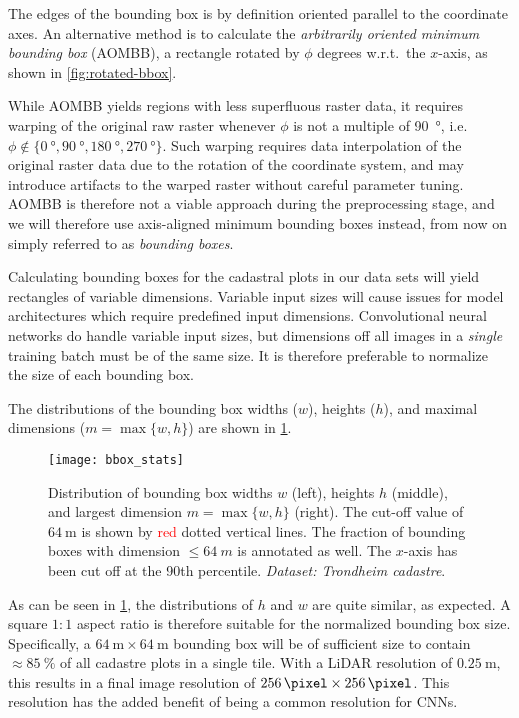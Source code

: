 The edges of the bounding box is by definition oriented parallel to the coordinate axes.
An alternative method is to calculate the \textit{arbitrarily oriented minimum bounding box} (AOMBB), a rectangle rotated by $\phi$ degrees w.r.t.\ the $x$-axis, as shown in \cref{fig:rotated-bbox}.

While AOMBB yields regions with less superfluous raster data, it requires warping of the original raw raster whenever $\phi$ is not a multiple of \SI{90}{\degree}, i.e.\ $\phi \not\in \{ \SI{0}{\degree}, \SI{90}{\degree}, \SI{180}{\degree}, \SI{270}{\degree} \}$.
Such warping requires data interpolation of the original raster data due to the rotation of the coordinate system, and may introduce artifacts to the warped raster without careful parameter tuning.
AOMBB is therefore not a viable approach during the preprocessing stage, and we will therefore use axis-aligned minimum bounding boxes instead, from now on simply referred to as \textit{bounding boxes}.

Calculating bounding boxes for the cadastral plots in our data sets will yield rectangles of variable dimensions.
Variable input sizes will cause issues for model architectures which require predefined input dimensions.
Convolutional neural networks do handle variable input sizes, but dimensions off all images in a \textit{single} training batch must be of the same size.
It is therefore preferable to normalize the size of each bounding box.

The distributions of the bounding box widths ($w$), heights ($h$), and maximal dimensions ($m = \max \{w, h\}$) are shown in \cref{fig:bbox-stats}.

\begin{figure}[htb]
  \texttt{[image: bbox\_stats]}
  \caption[Distribution of bounding box dimensions.]{%
    Distribution of bounding box widths $w$ (left), heights $h$ (middle), and largest dimension $m = \max \{w, h\}$ (right).
    The cut-off value of $\SI{64}{\meter}$ is shown by \textcolor{red}{red} dotted vertical lines.
    The fraction of bounding boxes with dimension $\leq \SI{64}{m}$ is annotated as well.
    The $x$-axis has been cut off at the 90th percentile.
    \textit{Dataset: Trondheim cadastre}.
  }%
  \label{fig:bbox-stats}
\end{figure}

As can be seen in \cref{fig:bbox-stats}, the distributions of $h$ and $w$ are quite similar, as expected.
A square $1:1$ aspect ratio is therefore suitable for the normalized bounding box size.
Specifically, a $\SI{64}{\meter} \times \SI{64}{\meter}$ bounding box will be of sufficient size to contain $\approx \SI{85}{\percent}$ of all cadastre plots in a single tile.
With a LiDAR resolution of $\SI{0.25}{\meter}$, this results in a final image resolution of $\SI{256}{\pixel} \times \SI{256}{\pixel}$.
This resolution has the added benefit of being a common resolution for CNNs.


